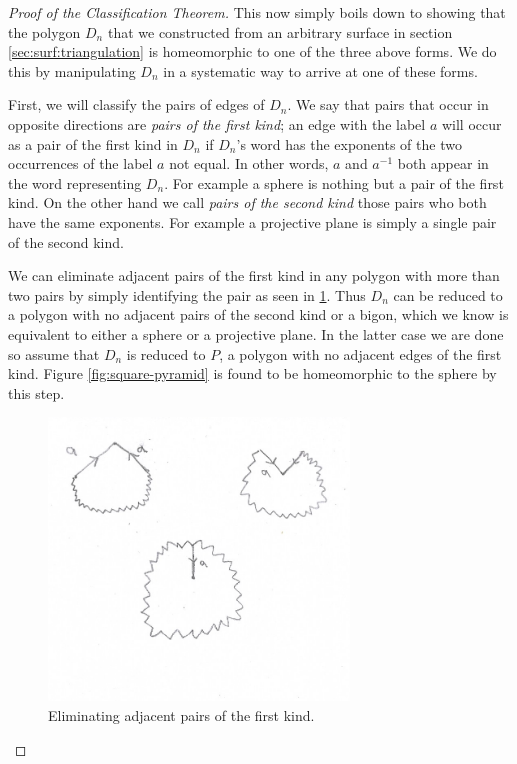  \begin{proof}[Proof of the Classification Theorem]
   This now simply boils down to showing that the polygon $D_n$ that
   we constructed from an arbitrary surface in section
   \ref{sec:surf:triangulation} is homeomorphic to one of the three
   above forms. We do this by manipulating $D_n$ in a systematic way
   to arrive at one of these forms.

   First, we will classify the pairs of edges of $D_n$. We say that
   pairs that occur in opposite directions are \emph{pairs of the
     first kind}; an edge with the label $a$ will occur as a pair of
   the first kind in $D_n$ if $D_n$'s word has the exponents of the
   two occurrences of the label $a$ not equal. In other words, $a$ and
   $a^{-1}$ both appear in the word representing $D_n$. For example a
   sphere is nothing but a pair of the first kind. On the other hand
   we call \emph{pairs of the second kind} those pairs who both have
   the same exponents. For example a projective plane is simply a
   single pair of the second kind.

   We can eliminate adjacent pairs of the first kind in any polygon
   with more than two pairs by simply identifying the pair as seen in
   \ref{fig:first-adjacent}. Thus $D_n$ can be reduced to a polygon
   with no adjacent pairs of the second kind or a bigon, which we know
   is equivalent to either a sphere or a projective plane. In the
   latter case we are done so assume that $D_n$ is reduced to $P$, a
   polygon with no adjacent edges of the first kind. Figure
   \ref{fig:square-pyramid} is found to be homeomorphic to the sphere
   by this step.

   \begin{figure}[htbp]
     \centering
     \includegraphics[width=8cm]{first.png}
     \caption{Eliminating adjacent pairs of the first kind.}
     \label{fig:first-adjacent}
   \end{figure}


\end{proof}
